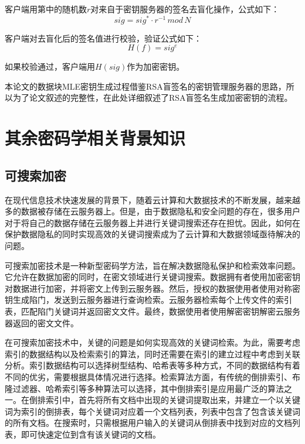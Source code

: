 \documentclass[promaster]{thesis-uestc}
\begin{document}
客户端用第中的随机数$r$对来自于密钥服务器的签名去盲化操作，公式如下：
\begin{equation}
    sig = sig^* \cdot r^{-1}\,mod\,N
\end{equation}

客户端对去盲化后的签名值进行校验，验证公式如下：
\begin{equation}
    H(f) = sig^e
\end{equation}

 如果校验通过，客户端用$H(sig)$作为加密密钥。

本论文的数据块MLE密钥生成过程借鉴RSA盲签名的密钥管理服务器的思路，所以为了论文叙述的完整性，在此处详细叙述了RSA盲签名生成加密密钥的流程。

\section{其余密码学相关背景知识}
\subsection{可搜索加密}
在现代信息技术快速发展的背景下，随着云计算和大数据技术的不断发展，越来越多的数据被存储在云服务器上。但是，由于数据隐私和安全问题的存在，很多用户对于将自己的数据存储在云服务器上并进行关键词搜索还存在担忧。因此，如何在保护数据隐私的同时实现高效的关键词搜索成为了云计算和大数据领域亟待解决的问题。

可搜索加密技术是一种新型密码学方法，旨在解决数据隐私保护和检索效率问题。它允许在数据加密的同时，在密文领域进行关键词搜索。数据拥有者使用加密密钥对数据进行加密，并将密文上传到云服务器。然后，授权的数据使用者使用对称密钥生成陷门，发送到云服务器进行查询检索。云服务器检索每个上传文件的索引表，匹配陷门关键词并返回密文文件。最终，数据使用者使用解密密钥解密云服务器返回的密文文件。

在可搜索加密技术中，关键的问题是如何实现高效的关键词检索。为此，需要考虑索引的数据结构以及检索索引的算法，同时还需要在索引的建立过程中考虑到关联分析。索引数据结构可以选择树型结构、哈希表等多种方式，不同的数据结构有着不同的优劣，需要根据具体情况进行选择。检索算法方面，有传统的倒排索引、布隆过滤器、哈希索引等多种算法可以选择，其中倒排索引是应用最广泛的算法之一。在倒排索引中，首先将所有文档中出现的关键词提取出来，并建立一个以关键词为索引的倒排表，每个关键词对应着一个文档列表，列表中包含了包含该关键词的所有文档。在搜索时，只需根据用户输入的关键词从倒排表中找到对应的文档列表，即可快速定位到含有该关键词的文档。
\end{document}
